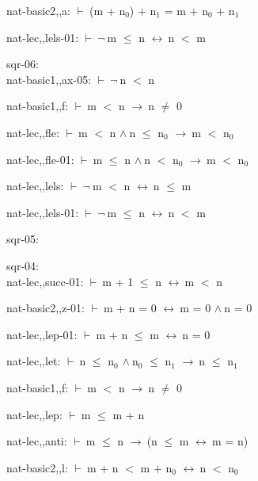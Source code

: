 \documentclass[a4paper]{article}
\newcommand{\Fol}{\mbox{$\vdash\ $}}
\newcommand{\Not}{\mbox{$\neg\ $}}
\newcommand{\And}{\mbox{$\wedge\ $}}
\newcommand{\Imp}{\mbox{$\rightarrow\ $}}
\newcommand{\Equiv}{\mbox{$\leftrightarrow\ $}}
\begin{document}
nat-basic2,,a: 
 \Fol (m + $\mbox{n}_{0}$) + $\mbox{n}_{1}$ = m + $\mbox{n}_{0}$ + $\mbox{n}_{1}$



nat-lec,,lels-01: 
 \Fol \Not m $\le$ n \Equiv n $<$ m



\bigskip

sqr-06:\\ nat-basic1,,ax-05: 
 \Fol \Not n $<$ n



nat-basic1,,f: 
 \Fol m $<$ n \Imp n $\neq$ 0



nat-lec,,fle: 
 \Fol m $<$ n \And n $\le$ $\mbox{n}_{0}$ \Imp m $<$ $\mbox{n}_{0}$



nat-lec,,fle-01: 
 \Fol m $\le$ n \And n $<$ $\mbox{n}_{0}$ \Imp m $<$ $\mbox{n}_{0}$



nat-lec,,lels: 
 \Fol \Not m $<$ n \Equiv n $\le$ m



nat-lec,,lels-01: 
 \Fol \Not m $\le$ n \Equiv n $<$ m



\bigskip

sqr-05:\\ 

\bigskip

sqr-04:\\ nat-lec,,succ-01: 
 \Fol m + 1 $\le$ n \Equiv m $<$ n



nat-basic2,,z-01: 
 \Fol m + n = 0 \Equiv m = 0 \And n = 0



nat-lec,,lep-01: 
 \Fol m + n $\le$ m \Equiv n = 0



nat-lec,,let: 
 \Fol n $\le$ $\mbox{n}_{0}$ \And $\mbox{n}_{0}$ $\le$ $\mbox{n}_{1}$ \Imp n $\le$ $\mbox{n}_{1}$



nat-basic1,,f: 
 \Fol m $<$ n \Imp n $\neq$ 0



nat-lec,,lep: 
 \Fol m $\le$ m + n



nat-lec,,anti: 
 \Fol m $\le$ n \Imp (n $\le$ m \Equiv m = n)



nat-basic2,,l: 
 \Fol m + n $<$ m + $\mbox{n}_{0}$ \Equiv n $<$ $\mbox{n}_{0}$
\end{document}
